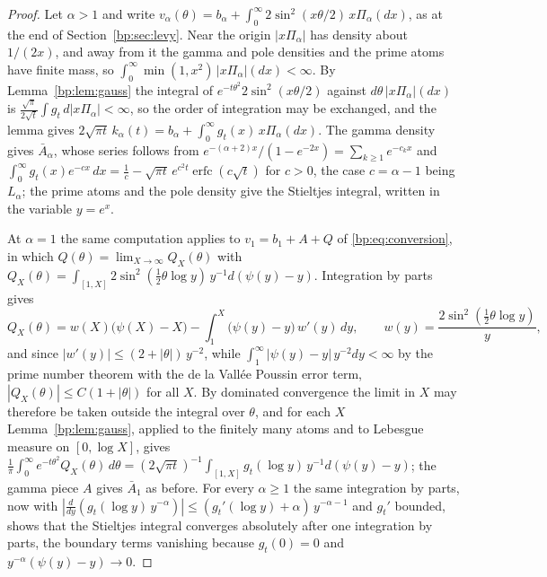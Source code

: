 \begin{proof}
Let $\alpha>1$ and write $v_\alpha(\theta)=b_\alpha+\int_0^\infty2\sin^2(x\theta/2)\,x\Pi_\alpha(dx)$, as at the end of Section~\ref{bp:sec:levy}. Near the origin $|x\Pi_\alpha|$ has density about $1/(2x)$, and away from it the gamma and pole densities and the prime atoms have finite mass, so $\int_0^\infty\min(1,x^2)\,|x\Pi_\alpha|(dx)<\infty$. By Lemma~\ref{bp:lem:gauss} the integral of $e^{-t\theta^2}2\sin^2(x\theta/2)$ against $d\theta\,|x\Pi_\alpha|(dx)$ is $\frac{\sqrt\pi}{2\sqrt t}\int g_t\,d|x\Pi_\alpha|<\infty$, so the order of integration may be exchanged, and the lemma gives $2\sqrt{\pi t}\,k_\alpha(t)=b_\alpha+\int_0^\infty g_t(x)\,x\Pi_\alpha(dx)$. The gamma density gives $\bar A_\alpha$, whose series follows from $e^{-(\alpha+2)x}/(1-e^{-2x})=\sum_{k\ge1}e^{-c_kx}$ and $\int_0^\infty g_t(x)e^{-cx}\,dx=\frac1c-\sqrt{\pi t}\,e^{c^2t}\operatorname{erfc}(c\sqrt t)$ for $c>0$, the case $c=\alpha-1$ being $L_\alpha$; the prime atoms and the pole density give the Stieltjes integral, written in the variable $y=e^x$.

At $\alpha=1$ the same computation applies to $v_1=b_1+A+Q$ of \eqref{bp:eq:conversion}, in which $Q(\theta)=\lim_{X\to\infty}Q_X(\theta)$ with $Q_X(\theta)=\int_{[1,X]}2\sin^2(\frac12\theta\log y)\,y^{-1}d(\psi(y)-y)$. Integration by parts gives
\[
Q_X(\theta)=w(X)\big(\psi(X)-X\big)-\int_1^X\big(\psi(y)-y\big)\,w'(y)\,dy,\qquad w(y)=\frac{2\sin^2(\frac12\theta\log y)}y,
\]
and since $|w'(y)|\le(2+|\theta|)\,y^{-2}$, while $\int_1^\infty|\psi(y)-y|\,y^{-2}dy<\infty$ by the prime number theorem with the de la Vall\'ee Poussin error term, $|Q_X(\theta)|\le C(1+|\theta|)$ for all $X$. By dominated convergence the limit in $X$ may therefore be taken outside the integral over $\theta$, and for each $X$ Lemma~\ref{bp:lem:gauss}, applied to the finitely many atoms and to Lebesgue measure on $[0,\log X]$, gives $\frac1\pi\int_0^\infty e^{-t\theta^2}Q_X(\theta)\,d\theta=(2\sqrt{\pi t})^{-1}\int_{[1,X]}g_t(\log y)\,y^{-1}d(\psi(y)-y)$; the gamma piece $A$ gives $\bar A_1$ as before. For every $\alpha\ge1$ the same integration by parts, now with $|\frac d{dy}(g_t(\log y)\,y^{-\alpha})|\le(g_t'(\log y)+\alpha)\,y^{-\alpha-1}$ and $g_t'$ bounded, shows that the Stieltjes integral converges absolutely after one integration by parts, the boundary terms vanishing because $g_t(0)=0$ and $y^{-\alpha}(\psi(y)-y)\to0$.
\end{proof}

